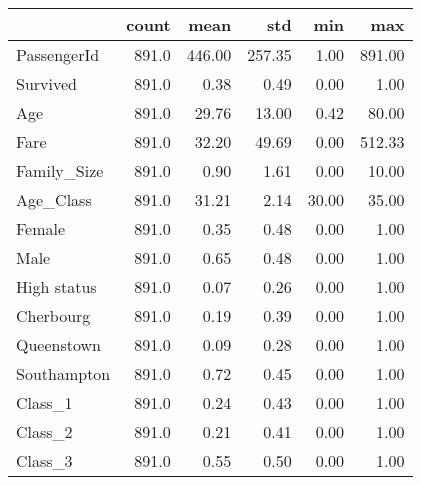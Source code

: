 \begin{tabular}{lrrrrr}
\toprule
{} &  count &    mean &     std &    min &     max \\
\midrule
PassengerId &  891.0 &  446.00 &  257.35 &   1.00 &  891.00 \\
Survived    &  891.0 &    0.38 &    0.49 &   0.00 &    1.00 \\
Age         &  891.0 &   29.76 &   13.00 &   0.42 &   80.00 \\
Fare        &  891.0 &   32.20 &   49.69 &   0.00 &  512.33 \\
Family\_Size &  891.0 &    0.90 &    1.61 &   0.00 &   10.00 \\
Age\_Class   &  891.0 &   31.21 &    2.14 &  30.00 &   35.00 \\
Female      &  891.0 &    0.35 &    0.48 &   0.00 &    1.00 \\
Male        &  891.0 &    0.65 &    0.48 &   0.00 &    1.00 \\
High status &  891.0 &    0.07 &    0.26 &   0.00 &    1.00 \\
Cherbourg   &  891.0 &    0.19 &    0.39 &   0.00 &    1.00 \\
Queenstown  &  891.0 &    0.09 &    0.28 &   0.00 &    1.00 \\
Southampton &  891.0 &    0.72 &    0.45 &   0.00 &    1.00 \\
Class\_1     &  891.0 &    0.24 &    0.43 &   0.00 &    1.00 \\
Class\_2     &  891.0 &    0.21 &    0.41 &   0.00 &    1.00 \\
Class\_3     &  891.0 &    0.55 &    0.50 &   0.00 &    1.00 \\
\bottomrule
\end{tabular}
